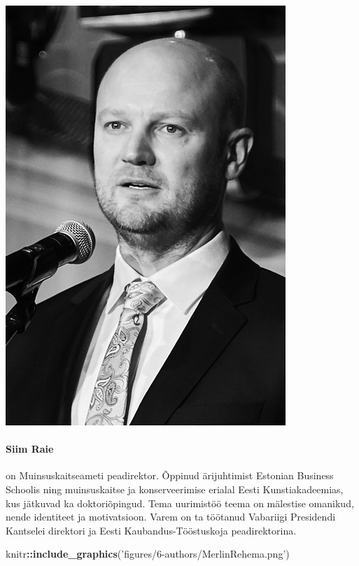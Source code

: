 \documentclass[estonian,]{article}
\newenvironment{Shaded}{\begin{snugshade}}{\end{snugshade}}
\newcommand{\KeywordTok}[1]{\textcolor[rgb]{0.13,0.29,0.53}{\textbf{#1}}}
\newcommand{\NormalTok}[1]{#1}
\newcommand{\OperatorTok}[1]{\textcolor[rgb]{0.81,0.36,0.00}{\textbf{#1}}}
\newcommand{\StringTok}[1]{\textcolor[rgb]{0.31,0.60,0.02}{#1}}
\let\oldparagraph\paragraph
\renewcommand{\paragraph}[1]{\oldparagraph{#1}\mbox{}}
\begin{document}
\begin{flushleft}\includegraphics[width=0.5\linewidth]{figures/6-authors/SiimRaie} \end{flushleft}

\hypertarget{siim-raie}{%
\paragraph{Siim Raie}\label{siim-raie}}

on Muinsuskaitseameti peadirektor. Õppinud ärijuhtimist Estonian Business Schoolis ning muinsuskaitse ja konserveerimise erialal Eesti Kunstiakadeemias, kus jätkuvad ka doktoriõpingud. Tema uurimistöö teema on mälestise omanikud, nende identiteet ja motivatsioon. Varem on ta töötanud Vabariigi Presidendi Kantselei direktori ja Eesti Kaubandus-Tööstuskoja peadirektorina.

\begin{Shaded}
\begin{Highlighting}[]
\NormalTok{knitr}\OperatorTok{::}\KeywordTok{include_graphics}\NormalTok{(}\StringTok{'figures/6-authors/MerlinRehema.png'}\NormalTok{)}
\end{Highlighting}
\end{Shaded}
\end{document}
